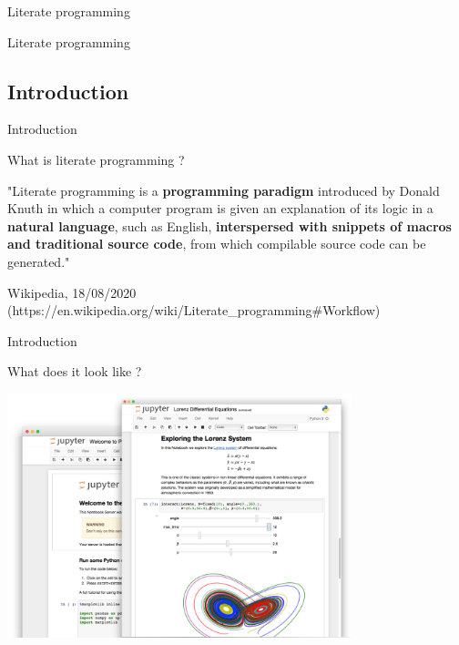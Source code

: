 \begin{frame}{Literate programming}

Literate programming

\end{frame}

\subsection{Introduction}

\begin{frame}{Introduction}

What is literate programming ?

\begin{definition}
"Literate programming is a \textbf{programming paradigm} introduced by Donald Knuth in which a computer program is given an explanation of its logic in a \textbf{natural language}, such as English, \textbf{interspersed with snippets of macros and traditional source code}, from which compilable source code can be generated."
\end{definition}


Wikipedia, 18/08/2020 (https://en.wikipedia.org/wiki/Literate\_programming\#Workflow)
\end{frame}

\begin{frame}{Introduction}

What does it look like ?

\centering\includegraphics[width=10cm]{07_notebook/images/literate_programming.png}

\end{frame}

